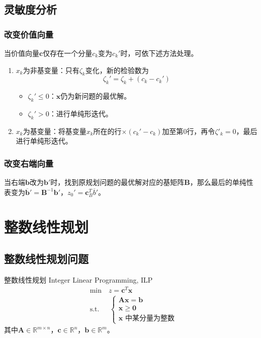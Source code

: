 \documentclass[lang = cn, scheme = chinese, thmcnt = section]{elegantbook}
\newcommand{\R}{\mathbb{R}}            %
\newcommand{\bs}{\boldsymbol}          %
\begin{document}
\section{灵敏度分析}

\subsection{改变价值向量}

当价值向量$\bs{c}$仅存在一个分量$c_k$变为$c_k'$时，可依下述方法处理。

\begin{enumerate}
	\item $x_k$为非基变量：只有$\zeta_k$变化，新的检验数为
	$$
	\zeta_k'=\zeta_k+(c_k-c_k')
	$$
	\begin{itemize}
		\item $\zeta_k'\le 0$：$\bs{x}$仍为新问题的最优解。
		\item $\zeta_k'>0$：进行单纯形迭代。
	\end{itemize}
	\item $x_k$为基变量：将基变量$x_k$所在的行$\times (c_k'-c_k)$加至第$0$行，再令$\zeta'_k=0$，最后进行单纯形迭代。
\end{enumerate}

\subsection{改变右端向量}

当右端$\bs{b}$改为$\bs{b}'$时，找到原规划问题的最优解对应的基矩阵$\bs{B}$，那么最后的单纯性表变为$\overline{\bs{b}}'=\bs{B}^{-1}\bs{b}'$，$z_0'=\bs{c}_B^T\overline{b}'$。

\chapter{整数线性规划}

\section{整数线性规划问题}

\begin{definition}{整数线性规划 Integer Linear Programming, ILP}
	\begin{align*}
		& \text{min}  \quad z=\bs{c}^T\bs{x}\\
		& \text{s.t.} \;\, \quad \begin{cases}
			\bs{A} \bs{x} = \bs{b}\\
			\bs{x} \ge \bs{0}\\
			\bs{x}\text{ 中某分量为整数}
		\end{cases}
	\end{align*}
	其中$\bs{A}\in\R^{m\times n}$，$\bs{c}\in \R^n$，$\bs{b}\in \R^m$。
\end{definition}
\end{document}
